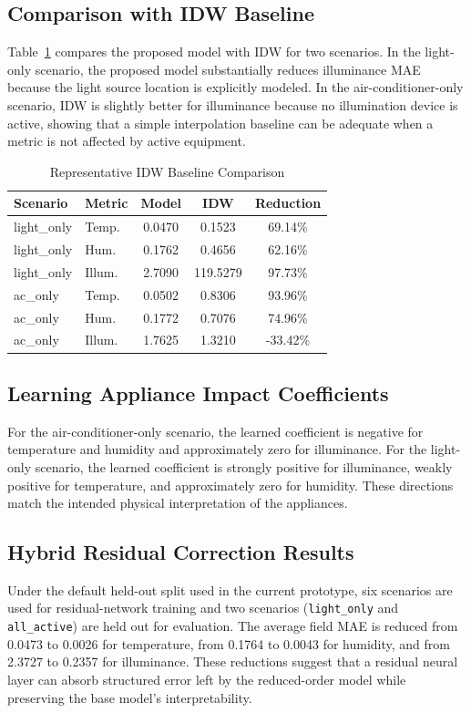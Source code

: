 \documentclass[conference]{IEEEtran}
\begin{document}
\subsection{Comparison with IDW Baseline}
Table~\ref{tab:idw} compares the proposed model with IDW for two scenarios. In the light-only scenario, the proposed model substantially reduces illuminance MAE because the light source location is explicitly modeled. In the air-conditioner-only scenario, IDW is slightly better for illuminance because no illumination device is active, showing that a simple interpolation baseline can be adequate when a metric is not affected by active equipment.

\begin{table}[t]
\caption{Representative IDW Baseline Comparison}
\label{tab:idw}
\centering
\begin{tabular}{|l|l|c|c|c|}
\hline
Scenario & Metric & Model & IDW & Reduction\\
\hline
light\_only & Temp. & 0.0470 & 0.1523 & 69.14\%\\
light\_only & Hum. & 0.1762 & 0.4656 & 62.16\%\\
light\_only & Illum. & 2.7090 & 119.5279 & 97.73\%\\
ac\_only & Temp. & 0.0502 & 0.8306 & 93.96\%\\
ac\_only & Hum. & 0.1772 & 0.7076 & 74.96\%\\
ac\_only & Illum. & 1.7625 & 1.3210 & -33.42\%\\
\hline
\end{tabular}
\end{table}

\subsection{Learning Appliance Impact Coefficients}
For the air-conditioner-only scenario, the learned coefficient is negative for temperature and humidity and approximately zero for illuminance. For the light-only scenario, the learned coefficient is strongly positive for illuminance, weakly positive for temperature, and approximately zero for humidity. These directions match the intended physical interpretation of the appliances.

\subsection{Hybrid Residual Correction Results}
Under the default held-out split used in the current prototype, six scenarios are used for residual-network training and two scenarios (\texttt{light\_only} and \texttt{all\_active}) are held out for evaluation. The average field MAE is reduced from 0.0473 to 0.0026 for temperature, from 0.1764 to 0.0043 for humidity, and from 2.3727 to 0.2357 for illuminance. These reductions suggest that a residual neural layer can absorb structured error left by the reduced-order model while preserving the base model's interpretability.
\end{document}
